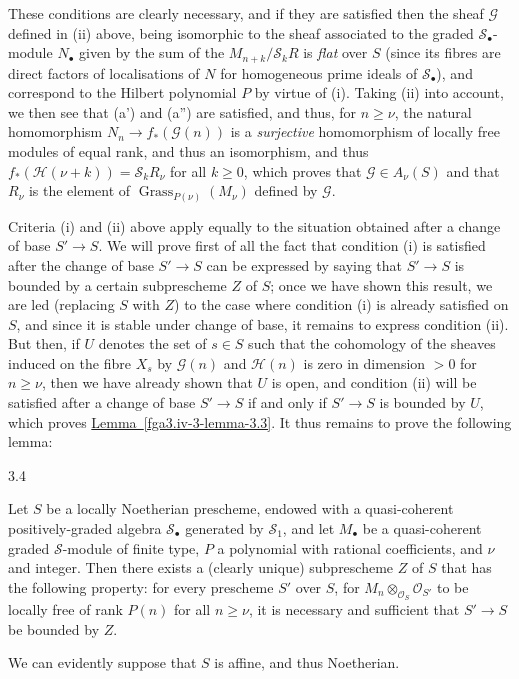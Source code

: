   These conditions are clearly necessary, and if they are satisfied then the sheaf \(\mathscr {G}\) defined in (ii) above, being isomorphic to the sheaf associated to the graded \(\mathscr {S}_\bullet \)-module \(N_\bullet \) given by the sum of the \(M_{n+k}/\mathscr {S}_kR\) is \emph{flat} over \(S\) (since its fibres are direct factors of localisations of \(N\) for homogeneous prime ideals of \(\mathcal {S}_\bullet \)), and correspond to the Hilbert polynomial \(P\) by virtue of (i).
  Taking (ii) into account, we then see that (a') and (a'') are satisfied, and thus, for \(n\geqslant \nu \), the natural homomorphism \(N_n\to  f_*(\mathscr {G} (n))\) is a \emph{surjective} homomorphism of locally free modules of equal rank, and thus an isomorphism, and thus \(f_*(\mathscr {H} (\nu +k))=\mathcal {S}_kR_\nu \) for all \(k\geqslant 0\), which proves that \(\mathscr {G}\in  A_\nu (S)\) and that \(R_\nu \) is the element of \(\operatorname {Grass}_{P(\nu )} (M_\nu )\) defined by \(\mathscr {G}\).\par{}Criteria (i) and (ii) above apply equally to the situation obtained after a change of base \(S'\to  S\).
  We will prove first of all the fact that condition (i) is satisfied after the change of base \(S'\to  S\) can be expressed by saying that \(S'\to  S\) is bounded by a certain subprescheme \(Z\) of \(S\);
  once we have shown this result, we are led (replacing \(S\) with \(Z\)) to the case where condition (i) is already satisfied on \(S\), and since it is stable under change of base, it remains to express condition (ii).
  But then, if \(U\) denotes the set of \(s\in  S\) such that the cohomology of the sheaves induced on the fibre \(X_s\) by \(\mathscr {G} (n)\) and \(\mathscr {H} (n)\) is zero in dimension \(>0\) for \(n\geqslant \nu \), then we have already shown that \(U\) is open, and condition (ii) will be satisfied after a change of base \(S'\to  S\) if and only if \(S'\to  S\) is bounded by \(U\), which proves \hyperref[fga3.iv-3-lemma-3.3]{Lemma~\ref*{fga3.iv-3-lemma-3.3}}.
  It thus remains to prove the following lemma:\begin{lemma}{3.4}\label{fga3.iv-3-lemma-3.4}\skipsinglepar\par{}Let \(S\) be a locally Noetherian prescheme, endowed with a quasi-coherent positively-graded algebra \(\mathcal {S}_\bullet \) generated by \(\mathcal {S}_1\), and let \(M_\bullet \) be a quasi-coherent graded \(\mathcal {S}\)-module of finite type, \(P\) a polynomial with rational coefficients, and \(\nu \) and integer.
    Then there exists a (clearly unique) subprescheme \(Z\) of \(S\) that has the following property:
    for every prescheme \(S'\) over \(S\), for \(M_n\otimes _{\mathcal {O}_S}\mathcal {O}_{S'}\) to be locally free of rank \(P(n)\) for all \(n\geqslant \nu \), it is necessary and sufficient that \(S'\to  S\) be bounded by \(Z\).\end{lemma}\par{}We can evidently suppose that \(S\) is affine, and thus Noetherian.
